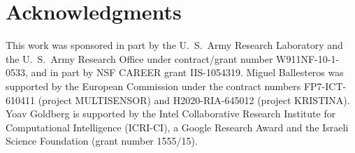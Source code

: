 \documentclass[11pt]{article}
\begin{document}
\section*{Acknowledgments}
 This work was sponsored in part by the U.~S.~Army Research Laboratory and the
 U.~S.~Army Research Office under contract/grant number W911NF-10-1-0533, and in
 part by NSF CAREER grant IIS-1054319. Miguel Ballesteros was supported by the
 European Commission under the contract numbers FP7-ICT-610411 (project
 MULTISENSOR) and H2020-RIA-645012 (project KRISTINA). 
 Yoav Goldberg is supported by the Intel Collaborative Research Institute for
 Computational Intelligence (ICRI-CI), a Google Research Award and the Israeli Science Foundation
 (grant number 1555/15).


%
\end{document}
